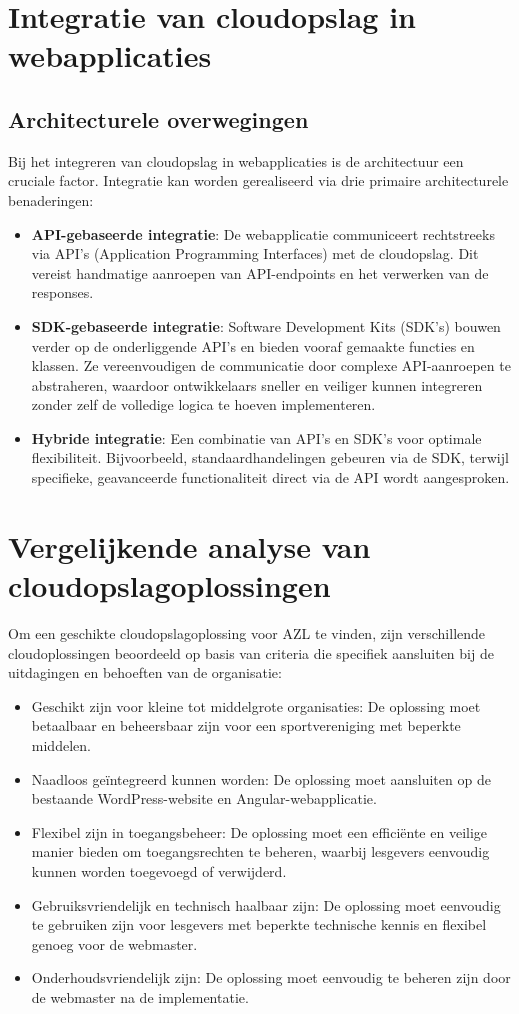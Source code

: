 \section{Integratie van cloudopslag in webapplicaties}
\subsection{Architecturele overwegingen}
Bij het integreren van cloudopslag in webapplicaties is de architectuur een cruciale factor. Integratie kan worden gerealiseerd via drie primaire architecturele benaderingen:
\begin{itemize}
  \item \textbf{API-gebaseerde integratie}: De webapplicatie communiceert rechtstreeks via API's (Application Programming Interfaces) met de cloudopslag. Dit vereist handmatige aanroepen van API-endpoints en het verwerken van de responses.
  \item \textbf{SDK-gebaseerde integratie}: Software Development Kits (SDK's) bouwen verder op de onderliggende API's en bieden vooraf gemaakte functies en klassen. Ze vereenvoudigen de communicatie door complexe API-aanroepen te abstraheren, waardoor ontwikkelaars sneller en veiliger kunnen integreren zonder zelf de volledige logica te hoeven implementeren.
  \item \textbf{Hybride integratie}: Een combinatie van API's en SDK's voor optimale flexibiliteit. Bijvoorbeeld, standaardhandelingen gebeuren via de SDK, terwijl specifieke, geavanceerde functionaliteit direct via de API wordt aangesproken.
\end{itemize}

\section{Vergelijkende analyse van cloudopslagoplossingen}
Om een geschikte cloudopslagoplossing voor AZL te vinden, zijn verschillende cloudoplossingen beoordeeld op basis van criteria die specifiek aansluiten bij de uitdagingen en behoeften van de organisatie:
\begin{itemize}
    \item Geschikt zijn voor kleine tot middelgrote organisaties: De oplossing moet betaalbaar en beheersbaar zijn voor een sportvereniging met beperkte middelen.
    \item Naadloos geïntegreerd kunnen worden: De oplossing moet aansluiten op de bestaande WordPress-website en Angular-webapplicatie.
    \item Flexibel zijn in toegangsbeheer: De oplossing moet een efficiënte en veilige manier bieden om toegangsrechten te beheren, waarbij lesgevers eenvoudig kunnen worden toegevoegd of verwijderd.
    \item Gebruiksvriendelijk en technisch haalbaar zijn: De oplossing moet eenvoudig te gebruiken zijn voor lesgevers met beperkte technische kennis en flexibel genoeg voor de webmaster.
    \item Onderhoudsvriendelijk zijn: De oplossing moet eenvoudig te beheren zijn door de webmaster na de implementatie.
\end{itemize}

